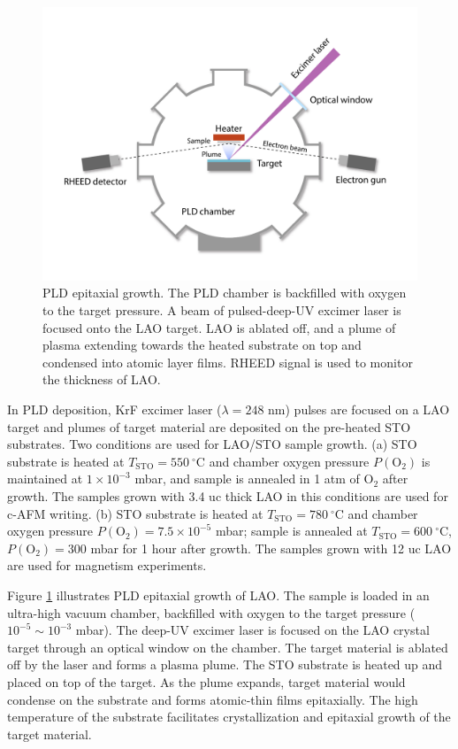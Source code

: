 \documentclass[pdflatex, sectionletters, 12pt]{pittetd}    %
\begin{document}
\begin{figure}[p]
	\centering
	\includegraphics[width=1.0\textwidth]{Drawing/PLD.pdf}
	\caption{PLD epitaxial growth. The PLD chamber is backfilled with oxygen to the target pressure. A beam of pulsed-deep-UV excimer laser is focused onto the LAO target. LAO is ablated off, and a plume of plasma extending towards the heated substrate on top and condensed into atomic layer films. RHEED signal is used to monitor the thickness of LAO.}
	\label{FIG:PLD}
\end{figure}

In PLD deposition, KrF excimer laser ($\lambda = 248$ nm) pulses are focused on a LAO target and plumes of target material are deposited on the pre-heated STO substrates. Two conditions are used for LAO/STO sample growth. (a) STO substrate is heated at $T_\mathrm{STO} = 550 \ ^{\circ}$C and chamber oxygen pressure $P(\mathrm{O}_2)$ is maintained at $1 \times 10^{-3}$ mbar, and sample is annealed in 1 atm of O$_2$ after growth. The samples grown with 3.4 uc thick LAO in this conditions are used for c-AFM writing. (b) STO substrate is heated at $T_\mathrm{STO} = 780 \ ^{\circ}$C and chamber oxygen pressure $P(\mathrm{O}_2) = 7.5 \times 10^{-5}$ mbar; sample is annealed at $T_\mathrm{STO} = 600 \ ^{\circ}$C, $P(\mathrm{O}_2) = 300$ mbar for 1 hour after growth. The samples grown with 12 uc LAO are used for magnetism experiments\cite{bi2014room}.

Figure \ref{FIG:PLD} illustrates PLD epitaxial growth of LAO. The sample is loaded in an ultra-high vacuum chamber, backfilled with oxygen to the target pressure ($10^{-5} \sim 10^{-3}$ mbar). The deep-UV excimer laser is focused on the LAO crystal target through an optical window on the chamber. The target material is ablated off by the laser and forms a plasma plume. The STO substrate is heated up and placed on top of the target. As the plume expands, target material would condense on the substrate and forms atomic-thin films epitaxially. The high temperature of the substrate facilitates crystallization and epitaxial growth of the target material. 
\\
\end{document}
